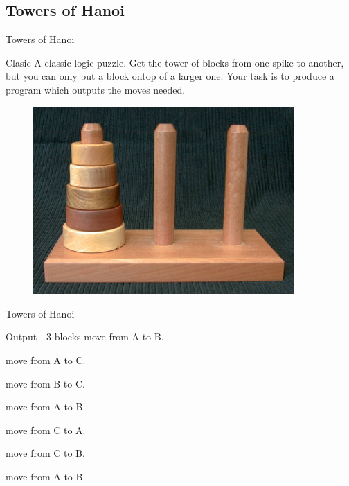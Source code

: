 \documentclass[10pt]{beamer}
\begin{document}
\subsection{Towers of Hanoi}

\begin{frame}{Towers of Hanoi}
	\begin{block}{Clasic}
		A classic logic puzzle. Get the tower of blocks from one spike to another, but you can only but a block ontop of a larger one.
		Your task is to produce a program which outputs the moves needed.
	\end{block}
	
	\begin{figure}
		\centering
		\includegraphics[width=0.89\textwidth]{images/hanoi}
	\end{figure}
\end{frame}

\begin{frame}{Towers of Hanoi}
	\begin{block}{Output - 3 blocks}
move from A to B.

move from A to C.

move from B to C.

move from A to B.

move from C to A.

move from C to B.

move from A to B.
	\end{block}
\end{frame}
\end{document}
